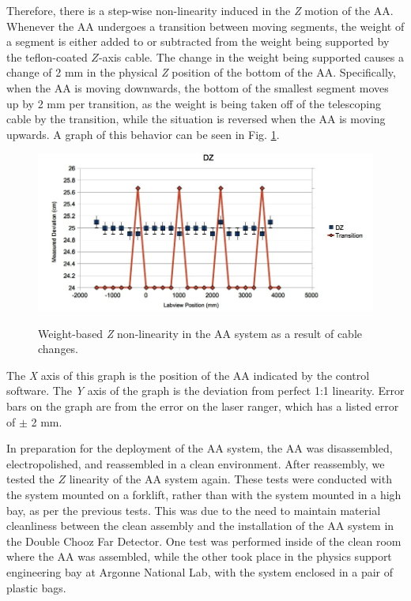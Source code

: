 Therefore, there is a step-wise non-linearity induced in the \emph{Z} motion of the AA. Whenever the AA undergoes a transition between moving segments, the weight of a segment is either added to or subtracted from the weight being supported by the teflon-coated $Z$-axis cable.  The change in the weight being supported causes a change of 2 mm in the physical \emph{Z} position of the bottom of the AA. Specifically, when the AA is moving downwards, the bottom of the smallest segment moves up by 2 mm per transition, as the weight is being taken off of the telescoping cable by the transition, while the situation is reversed when the AA is moving upwards. A graph of this behavior can be seen in Fig. \ref{Z-Non-Linearity}.

\begin{figure}
\caption{Weight-based \emph{Z} non-linearity in the AA system as a result of cable changes.}
\includegraphics[width=\textwidth]{AA/Transitions.jpg}
\label{Z-Non-Linearity}
\end{figure}

The \emph{X} axis of this graph is the position of the AA indicated by the control software. The \emph{Y} axis of the graph is the deviation from perfect 1:1 linearity. Error bars on the graph are from the error on the laser ranger, which has a listed error of $\pm$ 2 mm. 

In preparation for the deployment of the AA system, the AA was disassembled, electropolished, and reassembled in a clean environment. After reassembly, we tested the $Z$ linearity of the AA system again. These tests were conducted with the system mounted on a forklift, rather than with the system mounted in a high bay, as per the previous tests. This was due to the need to maintain material cleanliness between the clean assembly and the installation of the AA system in the Double Chooz Far Detector. One test was performed inside of the clean room where the AA was assembled, while the other took place in the physics support engineering bay at Argonne National Lab, with the system enclosed in a pair of plastic bags. 

